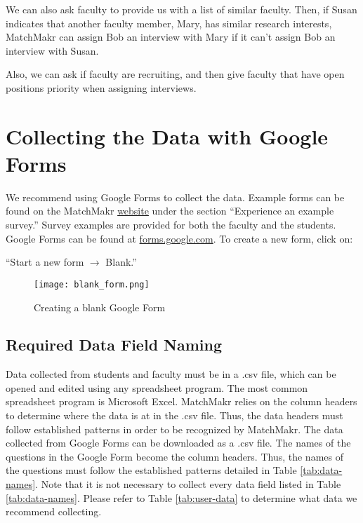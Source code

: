 We can also ask faculty to provide us with a list of similar faculty.  Then, if Susan indicates that another faculty member, Mary, has similar research interests, MatchMakr can assign Bob an interview with Mary if it can't assign Bob an interview with Susan.

Also, we can ask if faculty are recruiting, and then give faculty that have open positions priority when assigning interviews.



\section{Collecting the Data with Google Forms}

We recommend using Google Forms to collect the data.  Example forms can be found on the MatchMakr \href{https://sites.google.com/case.edu/matchmakr/home}{website} under the section ``Experience an example survey.''  Survey examples are provided for both the faculty and the students. Google Forms can be found at \url{forms.google.com}.  To create a new form, click on: \par ``Start a new form $\rightarrow$ Blank.''

\begin{figure}[!h]
	\texttt{[image: blank\_form.png]}
	\caption{\label{fig:blank-form} Creating a blank Google Form}
\end{figure}



%
%
\subsection{Required Data Field Naming}
Data collected from students and faculty must be in a .csv file, which can be opened and edited using any spreadsheet program.  The most common spreadsheet program is Microsoft Excel.  MatchMakr relies on the column headers to determine where the data is at in the .csv file.  Thus, the data headers must follow established patterns in order to be recognized by MatchMakr.  The data collected from Google Forms can be downloaded as a .csv file.  The names of the questions in the Google Form become the column headers.  Thus, the names of the questions must follow the established patterns detailed in Table \ref{tab:data-names}.  Note that it is not necessary to collect every data field listed in Table \ref{tab:data-names}.  Please refer to Table \ref{tab:user-data} to determine what data we recommend collecting.


